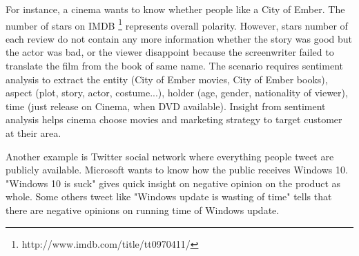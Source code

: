 For instance, a cinema wants to know whether people like a City of Ember. The number of stars on IMDB \footnote{http://www.imdb.com/title/tt0970411/} represents overall polarity. However, stars number of each review do not contain any more information whether the story was good but the actor was bad, or the viewer disappoint because the screenwriter failed to translate the film from the book of same name. The scenario requires sentiment analysis to extract the entity (City of Ember movies, City of Ember books), aspect (plot, story, actor, costume...), holder (age, gender, nationality of viewer), time (just release on Cinema, when DVD available). Insight from sentiment analysis helps cinema choose movies and marketing strategy to target customer at their area.

Another example is Twitter social network where everything people tweet are publicly available. Microsoft wants to know how the public receives Windows 10. "Windows 10 is suck" gives quick insight on negative opinion on the product as whole. Some others tweet like "Windows update is wasting of time" tells that there are negative opinions on running time of Windows update.


